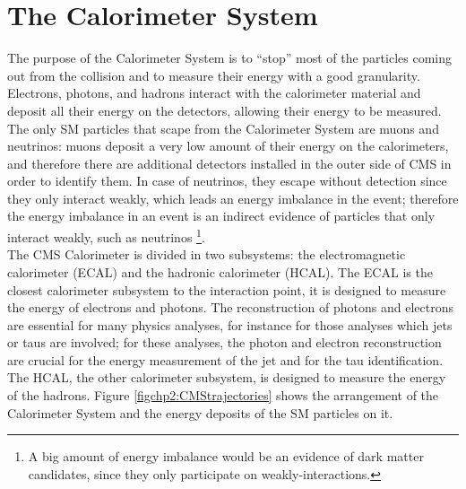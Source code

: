 \section{The Calorimeter System}

\noindent The purpose of the Calorimeter System is to ``stop'' most of the particles 
coming out from the collision and to measure their energy with a good 
granularity. Electrons, photons, and hadrons interact with the calorimeter 
material and deposit all their energy on the detectors, allowing their energy 
to be measured. The only SM particles that scape from the Calorimeter System are 
muons and neutrinos: muons deposit a very low amount of their energy on the 
calorimeters, and therefore there are additional detectors installed in the outer side 
of CMS in order to identify them. In case of neutrinos, they escape without detection
since they only interact weakly, which leads an energy imbalance in the event; therefore 
the energy imbalance in an event is an indirect evidence of particles that only interact weakly, such 
as neutrinos \footnote[1]{A big amount of energy 
imbalance would be an evidence of dark matter candidates, since they only participate on weakly-interactions.}. \\

\noindent The CMS Calorimeter is divided in two subsystems: the electromagnetic calorimeter (ECAL) and 
the hadronic calorimeter (HCAL). The ECAL is the closest calorimeter subsystem to the interaction point, 
it is designed to measure the energy of electrons and photons. The reconstruction of photons and 
electrons are essential for many physics analyses, for instance for those analyses which 
jets or taus are involved; for these analyses, the photon and electron 
reconstruction are crucial for the energy measurement of the jet and for 
the tau identification. The HCAL, the other calorimeter subsystem, is designed to measure the energy of the 
hadrons. Figure \ref{figchp2:CMStrajectories} shows the arrangement of the 
Calorimeter System and the energy deposits of the SM particles on it.




